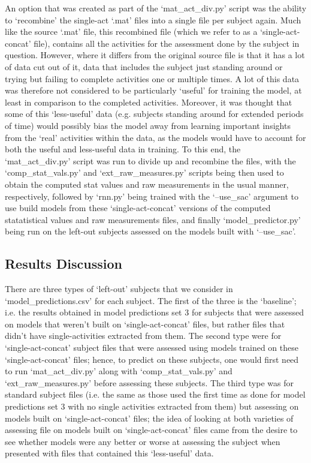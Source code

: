 \documentclass[12pt,twoside]{report}
\begin{document}
\quad An option that was created as part of the ‘mat\_act\_div.py’ script was the ability to ‘recombine’ the single-act ‘.mat’ files into a single file per subject again. Much like the source ‘.mat’ file, this recombined file (which we refer to as a ‘single-act-concat’ file), contains all the activities for the assessment done by the subject in question. However, where it differs from the original source file is that it has a lot of data cut out of it, data that includes the subject just standing around or trying but failing to complete activities one or multiple times. A lot of this data was therefore not considered to be particularly ‘useful’ for training the model, at least in comparison to the completed activities. Moreover, it was thought that some of this ‘less-useful’ data (e.g. subjects standing around for extended periods of time) would possibly bias the model away from learning important insights from the ‘real’ activities within the data, as the models would have to account for both the useful and less-useful data in training. To this end, the ‘mat\_act\_div.py’ script was run to divide up and recombine the files, with the ‘comp\_stat\_vals.py’ and ‘ext\_raw\_measures.py’ scripts being then used to obtain the computed stat values and raw measurements in the usual manner, respectively, followed by ‘rnn.py’ being trained with the ‘--use\_sac’ argument to use build models from these ‘single-act-concat’ versions of the computed statatistical values and raw measurements files, and finally ‘model\_predictor.py’ being run on the left-out subjects assessed on the models built with ‘--use\_sac’.

\subsection{Results Discussion}

\quad There are three types of ‘left-out’ subjects that we consider in ‘model\_predictions.csv’ for each subject. The first of the three is the ‘baseline’; i.e. the results obtained in model predictions set 3 for subjects that were assessed on models that weren’t built on ‘single-act-concat’ files, but rather files that didn’t have single-activities extracted from them. The second type were for ‘single-act-concat’ subject files that were assessed using models trained on these ‘single-act-concat’ files; hence, to predict on these subjects, one would first need to run ‘mat\_act\_div.py’ along with ‘comp\_stat\_vals.py’ and ‘ext\_raw\_measures.py’ before assessing these subjects. The third type was for standard subject files (i.e. the same as those used the first time as done for model predictions set 3 with no single activities extracted from them) but assessing on models built on ‘single-act-concat’ files; the idea of looking at both varieties of assessing file on models built on ‘single-act-concat’ files came from the desire to see whether models were any better or worse at assessing the subject when presented with files that contained this ‘less-useful’ data.\\
\end{document}
